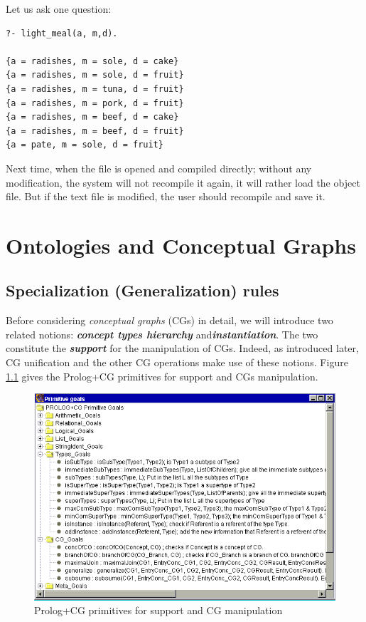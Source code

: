 \documentclass{book}
\begin{document}
Let us ask one question:

\begin{verbatim}
?- light_meal(a, m,d).

{a = radishes, m = sole, d = cake}
{a = radishes, m = sole, d = fruit}
{a = radishes, m = tuna, d = fruit}
{a = radishes, m = pork, d = fruit}
{a = radishes, m = beef, d = cake}
{a = radishes, m = beef, d = fruit}
{a = pate, m = sole, d = fruit}
\end{verbatim}


Next time, when the file is opened and
compiled directly; without any modification, the system will not
recompile it again, it will rather load the object file. But if the
text file is modified, the user should recompile and save
it.

\chapter{Ontologies and Conceptual Graphs}

\section{Specialization (Generalization)\label{Sec:SpecializationGeneralization}
rules}

Before considering {\it conceptual graphs} (CGs) in detail, we will
introduce two related notions: {\bf {\it concept types hierarchy}}
and{\bf {\it instantiation}}. The two constitute the {\it {\bf
support}} for the manipulation of CGs.  Indeed, as introduced later,
CG unification and the other CG operations make use of these
notions. Figure \ref{EnvPrimHierCG} gives the Prolog+CG primitives for
support and CGs manipulation.

\begin{latexonly}

\begin{figure}
\begin{center}
\includegraphics[scale=0.4]{EnvPrimHierCG.png}
\end{center}
\caption{\label{EnvPrimHierCG}Prolog+CG primitives for support and CG
manipulation}
\end{figure}

\end{latexonly}
\end{document}
